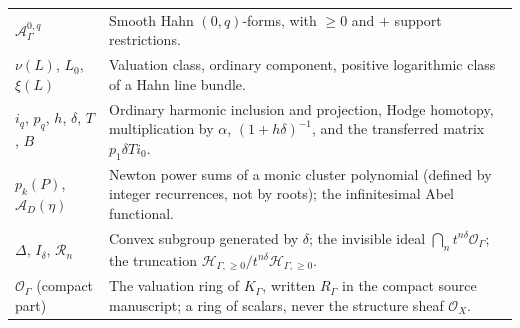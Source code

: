\documentclass[11pt,letterpaper]{article}
\theoremstyle{definition}
\theoremstyle{remark}
\newcommand{\OO}{\mathcal O}
\newcommand{\HI}{\mathscr H_{\Gamma,\ge0}}
\newcommand{\KK}{K_\Gamma}
\numberwithin{equation}{section}
\begin{document}
\begin{center}
\begin{tabular}{@{}L{0.26\textwidth}L{0.63\textwidth}@{}}
$\mathscr A^{0,q}_\Gamma$ & Smooth Hahn $(0,q)$-forms, with $\ge0$ and $+$ support restrictions.\\[0.3em]
$\nu(L)$, $L_0$, $\xi(L)$ & Valuation class, ordinary component, positive logarithmic class of a Hahn line bundle.\\[0.3em]
$i_q$, $p_q$, $h$, $\delta$, $T$, $B$ & Ordinary harmonic inclusion and projection, Hodge homotopy, multiplication by $\alpha$, $(1+h\delta)^{-1}$, and the transferred matrix $p_1\delta Ti_0$.\\[0.3em]
$p_k(P)$, $\mathcal A_D(\eta)$ & Newton power sums of a monic cluster polynomial (defined by integer recurrences, not by roots); the infinitesimal Abel functional.\\[0.3em]
$\Delta$, $I_\delta$, $\mathscr R_n$ & Convex subgroup generated by $\delta$; the invisible ideal $\bigcap_nt^{n\delta}\OO_\Gamma$; the truncation $\HI/t^{n\delta}\HI$.\\[0.3em]
$\OO_\Gamma$ (compact part) & The valuation ring of $\KK$, written $R_\Gamma$ in the compact source manuscript; a ring of scalars, never the structure sheaf $\OO_X$.\\
\bottomrule
\end{tabular}
\end{center}
\end{document}
